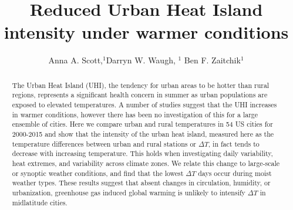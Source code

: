 \documentclass[12pt]{iopart}
\begin{document}
 

\title[Reduced UHI under warmer conditions]{Reduced Urban Heat Island intensity under warmer conditions} 



\author
{Anna A. Scott,$^{1}$Darryn W. Waugh, $^{1}$ Ben F. Zaitchik$^{1}$}
\address{$^{1}$Department of Earth and Planetary Sciences, Johns Hopkins University,3400 North Charles Street, MD 21212, USA}






\baselineskip24pt


\maketitle 




\begin{abstract}

The Urban Heat Island (UHI), the tendency for urban areas to be hotter than rural regions, represents a significant health concern in summer as urban populations are exposed to elevated temperatures.
A number of studies suggest that the UHI increases in warmer conditions,
however there has been no investigation of this for a large ensemble of cities.
Here we compare urban and rural temperatures in 54 US cities for 2000-2015 and show that the intensity of the urban heat island, measured here as the temperature differences between urban and rural stations or $\Delta T$, in fact tends to decrease with increasing temperature. 
This holds when investigating daily variability, heat extremes, and variability across climate zones. 
We relate this change to large-scale or synoptic weather conditions, and find that the lowest $\Delta T$ days occur during moist weather types.  
These results suggest that absent changes in circulation, humidity, or urbanization, greenhouse gas induced global warming is unlikely to intensify $\Delta T$ in midlatitude cities. 

\end{abstract}
\end{document}
